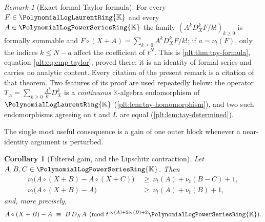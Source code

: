 \documentclass[11pt,oneside]{article}
\theoremstyle{plain}
\newtheorem{corollary}[theorem]{Corollary}
\theoremstyle{definition}
\theoremstyle{remark}
\newtheorem{remark}[theorem]{Remark}
\newcommand{\K}{\mathbb{K}}
\newcommand{\PLpow}{\PolynomialLogPowerSeriesRing{\K}}   %
\newcommand{\PLlau}{\PolynomialLogLaurentRing{\K}}       %
\newcommand{\ordt}{\nu_{t}}                              %
\newcommand{\DX}{D_{X}}                                  %
\newcommand{\compose}{\mathbin{\circ}}
\begin{document}
\begin{remark}[Exact formal Taylor formula]\label{plt:thm:grp-taylor}
For every \(F\in\PLlau\) and every \(A\in\PLpow\) the family
\((A^k\DX^kF/k!)_{k\ge0}\) is formally summable and
\(F\compose(X+A)=\sum_{k\ge0}A^k\DX^kF/k!\); if \(a=\ordt(F)\), only the
indices \(k\le N-a\) affect the coefficient of \(t^N\).  This is
\cref{plt:thm:tay-formula}, equation \eqref{plt:eq:cmp-taylor}, proved there;
it is an identity of formal series and carries no analytic content.  Every
citation of the present remark is a citation of that theorem.  Two features of
its proof are used repeatedly below: the operator
\(T_A=\sum_{k\ge0}\frac{A^k}{k!}\DX^k\) is a \emph{continuous} \(\K\)-algebra
endomorphism of \(\PLlau\) (\cref{plt:lem:tay-homomorphism}), and two such
endomorphisms agreeing on \(t\) and \(L\) are equal
(\cref{plt:lem:tay-determined}).
\end{remark}

The single most useful consequence is a gain of one outer block whenever a
near-identity argument is perturbed.

\begin{corollary}[Filtered gain, and the Lipschitz contraction]
\label{plt:cor:grp-gain}
Let \(A,B,C\in\PLpow\).  Then
\begin{align}
  \ordt\bigl(A\compose(X+B)-A\compose(X+C)\bigr)
  &\ \ge\ \ordt(A)+\ordt(B-C)+1,\label{plt:eq:grp-gain-lipschitz}\\
  \ordt\bigl(A\compose(X+B)-A\bigr)
  &\ \ge\ \ordt(A)+\ordt(B)+1,\label{plt:eq:grp-gain-absolute}
\end{align}
and, more precisely,
\begin{equation}\label{plt:eq:grp-gain-leading}
  A\compose(X+B)-A\ \equiv\ B\,\DX A
  \pmod{t^{\,\ordt(A)+2\ordt(B)+2}\PLpow}.
\end{equation}
\end{corollary}
\end{document}
